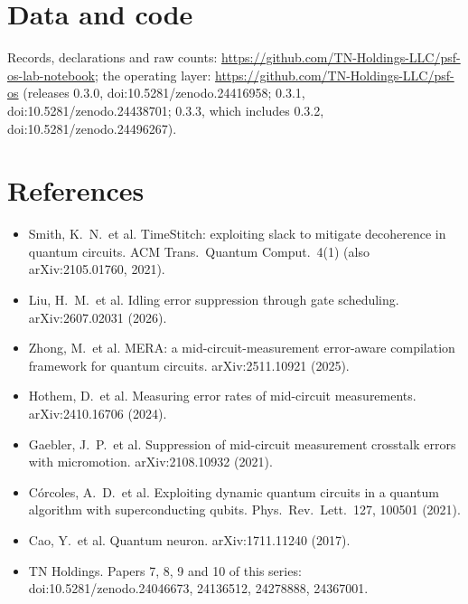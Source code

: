 \documentclass[10pt,a4paper]{article}
\begin{document}
\section*{Data and code}
Records, declarations and raw counts: \url{https://github.com/TN-Holdings-LLC/psf-os-lab-notebook}; the operating layer:
\url{https://github.com/TN-Holdings-LLC/psf-os} (releases 0.3.0, doi:10.5281/zenodo.24416958; 0.3.1, doi:10.5281/zenodo.24438701; 0.3.3, which includes 0.3.2, doi:10.5281/zenodo.24496267).

\section*{References}
\begin{itemize}
\item Smith, K.\ N.\ et al. TimeStitch: exploiting slack to mitigate decoherence in quantum circuits. ACM Trans.\ Quantum
Comput.\ 4(1) (also arXiv:2105.01760, 2021).
\item Liu, H.\ M.\ et al. Idling error suppression through gate scheduling. arXiv:2607.02031 (2026).
\item Zhong, M.\ et al. MERA: a mid-circuit-measurement error-aware compilation framework for quantum circuits. arXiv:2511.10921
(2025).
\item Hothem, D.\ et al. Measuring error rates of mid-circuit measurements. arXiv:2410.16706 (2024).
\item Gaebler, J.\ P.\ et al. Suppression of mid-circuit measurement crosstalk errors with micromotion.
arXiv:2108.10932 (2021).
\item C\'orcoles, A.\ D.\ et al. Exploiting dynamic quantum circuits in a quantum algorithm with superconducting qubits.
Phys.\ Rev.\ Lett.\ 127, 100501 (2021).
\item Cao, Y.\ et al. Quantum neuron. arXiv:1711.11240 (2017).
\item TN Holdings. Papers 7, 8, 9 and 10 of this series: doi:10.5281/zenodo.24046673, 24136512, 24278888, 24367001.
\end{itemize}
\end{document}
